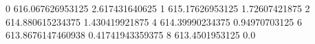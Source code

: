 0 616.067626953125 2.617431640625
1 615.17626953125 1.72607421875
2 614.880615234375 1.430419921875
4 614.39990234375 0.94970703125
6 613.8676147460938 0.41741943359375
8 613.4501953125 0.0
